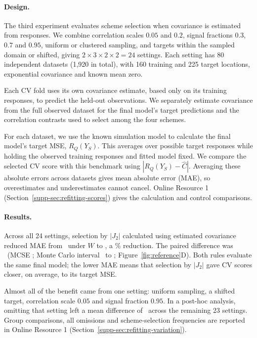 \paragraph{Design.}
The third experiment evaluates scheme selection when covariance is estimated from responses. We combine correlation scales $0.05$ and $0.2$, signal fractions $0.3$, $0.7$ and $0.95$, uniform or clustered sampling, and targets within the sampled domain or shifted, giving $2\times3\times2\times2=24$ settings. Each setting has 80 independent datasets (1,920 in total), with 160 training and 225 target locations, exponential covariance and known mean zero.

Each CV fold uses its own covariance estimate, based only on its training responses, to predict the held-out observations. We separately estimate covariance from the full observed dataset for the final model's target predictions and the correlation contrasts used to select among the four schemes.

For each dataset, we use the known simulation model to calculate the final model's target MSE, $R_Q(Y_S)$. This averages over possible target responses while holding the observed training responses and fitted model fixed. We compare the selected CV score with this benchmark using $|R_Q(Y_S)-\widehat C|$. Averaging these absolute errors across datasets gives mean absolute error (MAE), so overestimates and underestimates cannot cancel. Online Resource 1 (Section~\ref*{supp-sec:refitting-scores}) gives the calculation and control comparisons.

\paragraph{Results.}
Across all 24 settings, selection by $|J_2|$ calculated using estimated covariance reduced MAE from \NestedMAEW\ under $W$ to \NestedMAEJTwo, a \NestedReduction\% reduction. The paired difference was \NestedDelta\ (MCSE \NestedSE; Monte Carlo interval \NestedLower\ to \NestedUpper; Figure~\ref{fig:reference}D). Both rules evaluate the same final model; the lower MAE means that selection by $|J_2|$ gave CV scores closer, on average, to its target MSE.

Almost all of the benefit came from one setting: uniform sampling, a shifted target, correlation scale $0.05$ and signal fraction $0.95$. In a post-hoc analysis, omitting that setting left a mean difference of \NestedOtherCellsDelta\ across the remaining 23 settings. Group comparisons, all omissions and scheme-selection frequencies are reported in Online Resource 1 (Section~\ref*{supp-sec:refitting-variation}).

